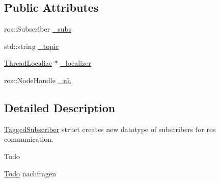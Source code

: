 \subsection*{Public Attributes}
\begin{DoxyCompactItemize}
\item 
ros\-::\-Subscriber \hyperlink{structohm__tsd__slam__ref_1_1TaggedSubscriber_a61345fb4c4b4e617dfffe70b5b1bd60c}{\-\_\-subs}
\item 
std\-::string \hyperlink{structohm__tsd__slam__ref_1_1TaggedSubscriber_a768a784062a20f2e9a11a1b528c11605}{\-\_\-topic}
\item 
\hyperlink{classohm__tsd__slam__ref_1_1ThreadLocalize}{Thread\-Localize} $\ast$ \hyperlink{structohm__tsd__slam__ref_1_1TaggedSubscriber_afe33f4a8274392173ea2a4ff05f49bc4}{\-\_\-localizer}
\item 
ros\-::\-Node\-Handle \hyperlink{structohm__tsd__slam__ref_1_1TaggedSubscriber_a0ff0c67d13bf2c9c606c25ffa24db8df}{\-\_\-nh}
\end{DoxyCompactItemize}


\subsection{Detailed Description}
\hyperlink{structohm__tsd__slam__ref_1_1TaggedSubscriber}{Tagged\-Subscriber} struct creates new datatype of subscribers for ros communication. 

\begin{DoxyRefDesc}{Todo}
\item[\hyperlink{todo__todo000009}{Todo}]nachfragen \end{DoxyRefDesc}


